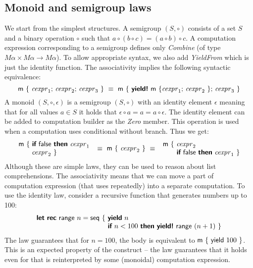 \documentclass[runningheads,a4paper]{llncs}
\begin{document}

\subsection{Monoid and semigroup laws}
\label{sec:laws-monoids}

We start from the simplest structures. A semigroup $(S, \circ)$ consists of a set
$S$ and a binary operation $\circ$ such that $a \circ (b \circ c) = (a \circ b) \circ c$.
A computation expression corresponding to a semigroup defines only \emph{Combine} (of type
$M\alpha \times M\alpha \rightarrow M\alpha$). To allow appropriate syntax, we also add
\emph{YieldFrom} which is just the identity function. The associativity implies the following
syntactic equivalence:
%
\begin{equation*}
\textnormal{\sffamily m}~\{~\textnormal{\emph{cexpr}}_1; \,\textnormal{\emph{cexpr}}_2; \,\textnormal{\emph{cexpr}}_3 ~\} ~\equiv~
  \textnormal{\sffamily m}~\{~\textnormal{\bfseries\sffamily yield!}~\textnormal{\sffamily m}~\{ \textnormal{\emph{cexpr}}_1; \,\textnormal{\emph{cexpr}}_2 ~\}; \,\textnormal{\emph{cexpr}}_3 ~\}
\end{equation*}
%
A monoid $(S, \circ, \epsilon)$ is a semigroup $(S, \circ)$ with an identity element $\epsilon$ meaning 
that for all values $a\in S$ it holds that $\epsilon \circ a = a = a \circ \epsilon$. The identity
element can be added to computation builder as the \emph{Zero} member. This operation is used when
a computation uses conditional without  branch. Thus we get:
%
\begin{equation*}
\begin{array}{l}
\textnormal{\sffamily m}~\{~  \textnormal{\bfseries\sffamily if}~\textnormal{\sffamily false}~\textnormal{\bfseries\sffamily then}~ \textnormal{\emph{cexpr}}_1\\
\hspace{1.9em} \textnormal{\emph{cexpr}}_2 ~\}
\end{array} 
~\equiv~
\textnormal{\sffamily m}~\{~ \textnormal{\emph{cexpr}}_2 ~\}\\
~\equiv~
\begin{array}{l}
\textnormal{\sffamily m}~\{~  \textnormal{\emph{cexpr}}_2 \\
\hspace{2.0em} \textnormal{\bfseries\sffamily if}~\textnormal{\sffamily false}~\textnormal{\bfseries\sffamily then}~ \textnormal{\emph{cexpr}}_1 ~\}
\end{array}
\end{equation*}
%
Although these are simple laws, they can be used to reason about list comprehensions. The associativity
means that we can move a part of computation expression (that uses  repeatedly) into a
separate computation. To use the identity law, consider a recursive function that generates numbers
up to 100:
%
\begin{equation*}
\begin{array}{l}
\kvd{let}~\kvd{rec}~\ident{range}~n =  \ident{seq}~\{~ \kvd{yield}~n\\
\hspace{10.3em} \kvd{if}~n < 100~\kvd{then}~\kvd{yield!}~\ident{range}~(n + 1)~\}
\end{array}
\end{equation*}
%
The law guarantees that for $n=100$, the body is equivalent to $\textnormal{\sffamily m}~\{~\textnormal{\sffamily yield}~100~\}$.
This is an expected property of the  construct -- the law guarantees that it holds even 
for  that is reinterpreted by some (monoidal) computation expression.
\end{document}
